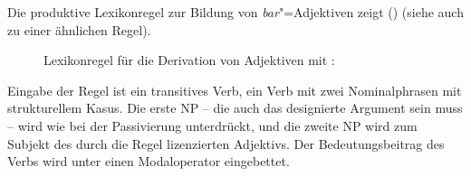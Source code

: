Die produktive Lexikonregel zur Bildung von \emph{bar}"=Adjektiven zeigt () (siehe auch 
zu einer ähnlichen Regel).
\begin{figure}
\eas
\label{lr-bar-adj}
Lexikonregel für die Derivation von Adjektiven mit \bars:\\
\zs
\vspace{-\baselineskip}\end{figure}
Eingabe der Regel ist ein transitives Verb, \dash ein Verb mit zwei Nominalphrasen mit strukturellem Kasus.
Die erste NP -- die auch das designierte Argument sein muss  -- wird wie bei der Passivierung unterdrückt, 
und die zweite NP  wird zum Subjekt des durch die Regel lizenzierten Adjektivs.
Der Bedeutungsbeitrag des Verbs  wird unter einen Modaloperator eingebettet.
